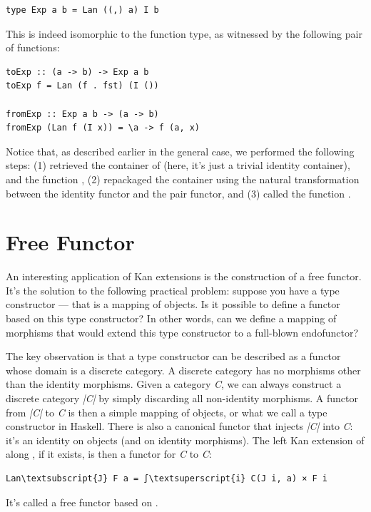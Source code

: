 \begin{verbatim}
type Exp a b = Lan ((,) a) I b
\end{verbatim}
This is indeed isomorphic to the function type, as witnessed by the
following pair of functions:

\begin{verbatim}
toExp :: (a -> b) -> Exp a b
toExp f = Lan (f . fst) (I ())

fromExp :: Exp a b -> (a -> b)
fromExp (Lan f (I x)) = \a -> f (a, x)
\end{verbatim}
Notice that, as described earlier in the general case, we performed the
following steps: (1) retrieved the container of  (here, it's
just a trivial identity container), and the function , (2)
repackaged the container using the natural transformation between the
identity functor and the pair functor, and (3) called the function
.

\section{Free Functor}\label{free-functor}

An interesting application of Kan extensions is the construction of a
free functor. It's the solution to the following practical problem:
suppose you have a type constructor --- that is a mapping of objects. Is
it possible to define a functor based on this type constructor? In other
words, can we define a mapping of morphisms that would extend this type
constructor to a full-blown endofunctor?

The key observation is that a type constructor can be described as a
functor whose domain is a discrete category. A discrete category has no
morphisms other than the identity morphisms. Given a category \emph{C},
we can always construct a discrete category \emph{|C|}
by simply discarding all non-identity morphisms. A functor 
from \emph{|C|} to \emph{C} is then a simple mapping
of objects, or what we call a type constructor in Haskell. There is also
a canonical functor  that injects \emph{|C|}
into \emph{C}: it's an identity on objects (and on identity morphisms).
The left Kan extension of  along , if it exists, is
then a functor for \emph{C} to \emph{C}:

\begin{Verbatim}[commandchars=\\\{\}]
Lan\textsubscript{J} F a = ∫\textsuperscript{i} C(J i, a) × F i
\end{Verbatim}
It's called a free functor based on .

